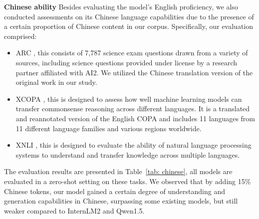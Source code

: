\documentclass{article}
\begin{document}
\noindent\textbf{Chinese ability} Besides evaluating the model's English proficiency, we also conducted assessments on its Chinese language capabilities due to the presence of a certain proportion of Chinese content in our corpus. Specifically, our evaluation comprised:
\begin{itemize}
\item ARC \citep{Clark2018ThinkYH}, this consists of 7,787 science exam questions drawn from a variety of sources, including science questions provided under license by a research partner affiliated with AI2. We utilized the Chinese translation version of the original work in our study.
\item XCOPA \citep{ponti2020xcopa}, this is designed to assess how well machine learning models can transfer commonsense reasoning across different languages. It is a translated and reannotated version of the English COPA \citep{Gordon2011ChoiceOP} and includes 11 languages from 11 different language families and various regions worldwide. 
\item XNLI \citep{conneau2018xnli}, this is designed to evaluate the ability of natural language processing systems to understand and transfer knowledge across multiple languages.
\end{itemize}

The evaluation results are presented in Table~\ref{tab: chinese}, all models are evaluated in a zero-shot setting on these tasks. We observed that by adding 15\% Chinese tokens, our model gained a certain degree of understanding and generation capabilities in Chinese, surpassing some existing models, but still weaker compared to InternLM2 and Qwen1.5.
\end{document}
